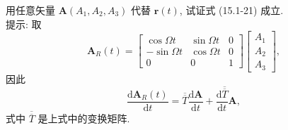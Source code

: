 \documentclass[twoside]{note}
\begin{document}
\begin{exe}
    用任意矢量 $\bm{A}(A_1,A_2,A_3)$ 代替 $\bm{r}(t)$, 试证式 (15.1-21) 成立.\\
    提示: 取
    \[
        \bm{A}_{R}(t)=\begin{bmatrix}
            \cos\Omega t&\sin\Omega t&0\\
            -\sin\Omega t&\cos\Omega t&0\\
            0&0&1
        \end{bmatrix}\begin{bmatrix}
            A_1\\
            A_2\\
            A_3
        \end{bmatrix},
    \]
    因此
    \[
        \frac{\mathrm{d}\bm{A}_R(t)}{\mathrm{d}t}=\overline{\overline{T}}\frac{\mathrm{d}\bm{A}}{\mathrm{d}t}+\frac{\mathrm{d}\overline{\overline{T}}}{\mathrm{d}t}\bm{A},
    \]
    式中 $\overline{\overline{T}}$ 是上式中的变换矩阵.
\end{exe}
\end{document}
